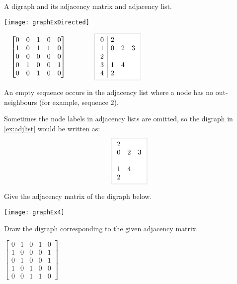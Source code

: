 \begin{Boxample}
\label{ex:adjlist}
A digraph and its adjacency matrix and adjacency list.\\
\begin{center}
\begin{minipage}[c]{0.3\textwidth}
\centering
\texttt{[image: graphExDirected]}
\end{minipage}
\begin{minipage}[c]{0.65\textwidth}
$\quad\left[
	\begin{matrix}
	0 & 0 & 1 & 0 & 0 \\
	1 & 0 & 1 & 1 & 0 \\
	0 & 0 & 0 & 0 & 0 \\
	0 & 1 & 0 & 0 & 1 \\
	0 & 0 & 1 & 0 & 0 
	\end{matrix}
\right]
\qquad \qquad
\lightgraybox{
	\begin{array}{c|ccc}
	0 & 2  \\
	1 & 0 & 2 & 3  \\
	2  \\
	3 & 1 & 4  \\
	4 & 2 \\
	\end{array}
}$
\end{minipage}
\end{center}
An empty sequence occurs in the adjacency list where a node has no out-neighbours (for example, sequence $2$). 
\end{Boxample}

Sometimes the node labels in adjacency lists are omitted, so the digraph in \cref{ex:adjlist} would be written as:
$$\lightgraybox{
	\begin{array}{ccc}
	2 &   &   \\
	0 & 2 & 3 \\
	  &   &   \\
	1 & 4 &   \\
	2 &   &   \\
	\end{array}
}$$

\begin{Boxample}[2]
Give the adjacency matrix of the digraph below.

	\vspace{1cm}
	\texttt{[image: graphEx4]}
	\vspace{1cm}
	
Draw the digraph corresponding to the given adjacency matrix.

	\vspace{1cm}
	$\left[
	\begin{matrix}
	0 & 1 & 0 & 1 & 0 \\
	1 & 0 & 0 & 0 & 1 \\
	0 & 1 & 0 & 0 & 1 \\
	1 & 0 & 1 & 0 & 0 \\
	0 & 0 & 1 & 1 & 0 
	\end{matrix}
	\right]$
\end{Boxample}

